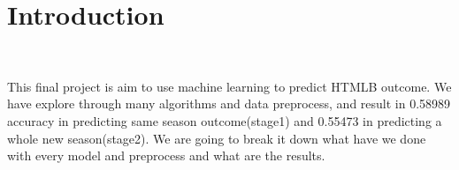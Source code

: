 \section{Introduction}
\ \par This final project is aim to use machine learning to predict HTMLB outcome. We have explore through many algorithms and data preprocess, and result in 0.58989 accuracy in predicting same season outcome(stage1) and 0.55473 in predicting a whole new season(stage2). We are going to break it down what have we done with every model and preprocess and what are the results.
